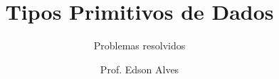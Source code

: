 \title{Tipos Primitivos de Dados}
\subtitle{Problemas resolvidos}
\date{}
\author{Prof. Edson Alves}
